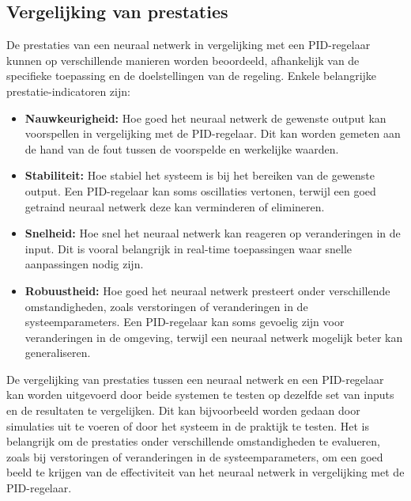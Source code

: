 \subsection{Vergelijking van prestaties}
De prestaties van een neuraal netwerk in vergelijking met een PID-regelaar kunnen op verschillende manieren worden beoordeeld, afhankelijk van de specifieke toepassing en de doelstellingen van de regeling. Enkele belangrijke prestatie-indicatoren zijn:
\begin{itemize}
  \item \textbf{Nauwkeurigheid:} Hoe goed het neuraal netwerk de gewenste output kan voorspellen in vergelijking met de PID-regelaar. Dit kan worden gemeten aan de hand van de fout tussen de voorspelde en werkelijke waarden.
  \item \textbf{Stabiliteit:} Hoe stabiel het systeem is bij het bereiken van de gewenste output. Een PID-regelaar kan soms oscillaties vertonen, terwijl een goed getraind neuraal netwerk deze kan verminderen of elimineren.
  \item \textbf{Snelheid:} Hoe snel het neuraal netwerk kan reageren op veranderingen in de input. Dit is vooral belangrijk in real-time toepassingen waar snelle aanpassingen nodig zijn.
  \item \textbf{Robuustheid:} Hoe goed het neuraal netwerk presteert onder verschillende omstandigheden, zoals verstoringen of veranderingen in de systeemparameters. Een PID-regelaar kan soms gevoelig zijn voor veranderingen in de omgeving, terwijl een neuraal netwerk mogelijk beter kan generaliseren.
\end{itemize}
De vergelijking van prestaties tussen een neuraal netwerk en een PID-regelaar kan worden uitgevoerd door beide systemen te testen op dezelfde set van inputs en de resultaten te vergelijken. Dit kan bijvoorbeeld worden gedaan door simulaties uit te voeren of door het systeem in de praktijk te testen. Het is belangrijk om de prestaties onder verschillende omstandigheden te evalueren, zoals bij verstoringen of veranderingen in de systeemparameters, om een goed beeld te krijgen van de effectiviteit van het neuraal netwerk in vergelijking met de PID-regelaar.




